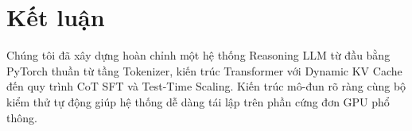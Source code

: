 \section{Kết luận}
Chúng tôi đã xây dựng hoàn chỉnh một hệ thống Reasoning LLM từ đầu bằng PyTorch thuần từ tầng Tokenizer, kiến trúc Transformer với Dynamic KV Cache đến quy trình CoT SFT và Test-Time Scaling. Kiến trúc mô-đun rõ ràng cùng bộ kiểm thử tự động giúp hệ thống dễ dàng tái lập trên phần cứng đơn GPU phổ thông.
